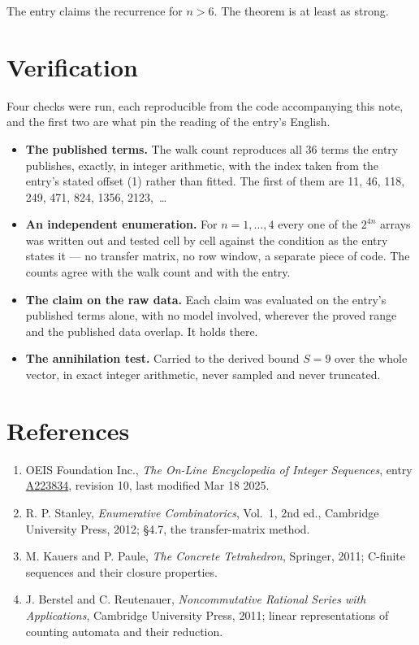 \documentclass[11pt]{article}
\theoremstyle{definition}
\begin{document}
The entry claims the recurrence for $n > 6$. The theorem is at least as strong.

\section{Verification}

Four checks were run, each reproducible from the code accompanying this note, and the first two are what pin the reading of the entry's English.

\begin{itemize}

\item {\bfseries The published terms.} The walk count reproduces all 36 terms the entry publishes, exactly, in integer arithmetic, with the index taken from the entry's stated offset (1) rather than fitted. The first of them are 11, 46, 118, 249, 471, 824, 1356, 2123,~\dots

\item {\bfseries An independent enumeration.} For $n = 1,\dots,4$ every one of the $2^{4n}$ arrays was written out and tested cell by cell against the condition as the entry states it --- no transfer matrix, no row window, a separate piece of code. The counts agree with the walk count and with the entry.

\item {\bfseries The claim on the raw data.} Each claim was evaluated on the entry's published terms alone, with no model involved, wherever the proved range and the published data overlap. It holds there.

\item {\bfseries The annihilation test.} Carried to the derived bound $S = 9$ over the whole vector, in exact integer arithmetic, never sampled and never truncated.

\end{itemize}

\section{References}

\begin{enumerate}

\item OEIS Foundation Inc., \emph{The On-Line Encyclopedia of Integer Sequences}, entry \href{https://oeis.org/A223834}{A223834}, revision 10, last modified Mar 18 2025.

\item R. P. Stanley, \emph{Enumerative Combinatorics}, Vol.~1, 2nd ed., Cambridge University Press, 2012; \S4.7, the transfer-matrix method.

\item M. Kauers and P. Paule, \emph{The Concrete Tetrahedron}, Springer, 2011; C-finite sequences and their closure properties.

\item J. Berstel and C. Reutenauer, \emph{Noncommutative Rational Series with Applications}, Cambridge University Press, 2011; linear representations of counting automata and their reduction.

\end{enumerate}
\end{document}
